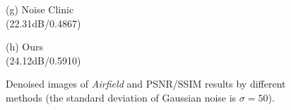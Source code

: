 \documentclass[runningheads]{llncs}
\begin{document}
\begin{figure}
{\begin{minipage}[t]{0.244\textwidth}
{\footnotesize (g) Noise Clinic \\(22.31dB/0.4867)}
\end{minipage}
\begin{minipage}[t]{0.244\textwidth}
\centering
{}
{\footnotesize (h) Ours \\(24.12dB/0.5910)}
\end{minipage}
}
\caption{Denoised images of \textsl{Airfield} and PSNR/SSIM results by different methods (the standard deviation of Gaussian noise is $\sigma=50$).}
\label{fig5}
\end{figure}
\end{document}
